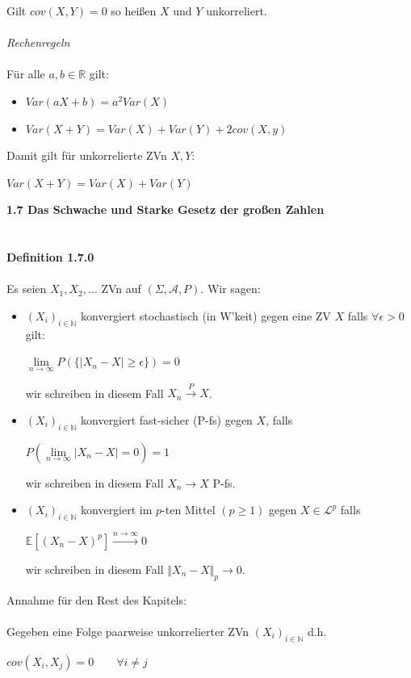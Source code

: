 \documentclass[10pt,a4paper]{report}
\numberwithin{equation}{section}
\numberwithin{figure}{section}
\theoremstyle{plain}
\theoremstyle{definition}
\theoremstyle{plain}
\theoremstyle{definition}
\theoremstyle{remark}
\theoremstyle{plain}
\theoremstyle{plain}
\theoremstyle{plain}
\newcommand{\1}{ \mathbb{1} } %
\begin{document}
Gilt $cov(X,Y)=0$ so heißen $X$ und $Y$ unkorreliert.\\\\
\textit{Rechenregeln}\\\\
Für alle $a,b \in \mathbb{R}$ gilt:
\begin{itemize}
\item $Var(aX+b)=a^2Var(X)$
\item $Var(X+Y)=Var(X)+Var(Y)+2cov(X,y)$
\end{itemize}
Damit gilt für unkorrelierte ZVn $X,Y$:
\begin{center}
$Var(X+Y)=Var(X)+Var(Y)$
\end{center} 
\Large{\textbf{1.7 Das Schwache und Starke Gesetz der großen Zahlen}}\normalsize\\\\\\
\textbf{Definition 1.7.0}\\\\
Es seien $X_1,X_2,\ldots$ ZVn auf $(\Sigma,\mathcal{A},P)$. Wir sagen:
\begin{itemize}
\item $(X_i)_{i \in \mathbb{N}}$ konvergiert stochastisch (in W'keit) gegen eine ZV $X$ falls $\forall\epsilon >0$ gilt:
\begin{center}
$\lim\limits_{n \to \infty}P(\{|X_n-X|\geq \epsilon\})=0$
\end{center}
wir schreiben in diesem Fall $X_n \overset{P}{\to} X$.
\item $(X_i)_{i \in \mathbb{N}}$ konvergiert fast-sicher (P-fs) gegen $X$, falls 
\begin{center}
$P\left(\lim\limits_{n \to \infty}|X_n-X|=0\right)=1$
\end{center}
wir schreiben in diesem Fall $X_n \to X$ P-fs.
\item $(X_i)_{i \in \mathbb{N}}$ konvergiert im $p$-ten Mittel $(p\geq 1)$ gegen $X \in \mathcal{L}^p$ falls
\begin{center}
$\mathbb{E}[(X_n-X)^p] \overset{n \to \infty}{\to}0$
\end{center} 
wir schreiben in diesem Fall $\Vert X_n-X\Vert_p \to 0$.\\
\end{itemize}
Annahme für den Rest des Kapitels:\\\\
Gegeben eine Folge paarweise unkorrelierter ZVn $(X_i)_{i \in \mathbb{N}}$ d.h.
\begin{center}
$cov(X_i,X_j)=0 \qquad \forall i\neq j$
\end{center}
\end{document}
